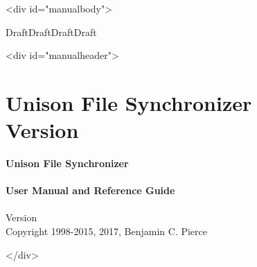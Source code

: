 \documentclass{article}
\begin{document}
\ifhevea\begin{rawhtml}<div id="manualbody">\end{rawhtml}\fi

\ifhevea\else\bigskip\fi%
\ifdraft%
\begin{center}%
{\Huge \ifhevea\red\fi DraftDraftDraftDraft}%
\end{center}%
\ifhevea\else \bigskip \fi
\fi

\ifhevea\begin{rawhtml}<div id="manualheader">\end{rawhtml}%
\else \thispagestyle{empty}
\fi%
%
\iftextversion
  \section*{Unison File Synchronizer
  \\
  Version
  \unisonversion
  }
\else%
  \ifhevea\else \vspace*{2in} \fi%
  \begin{center}%
  \Huge{\ifhevea\black\else\bf \fi Unison File  Synchronizer}%
  \ifhevea \\ \else \\[2ex] \fi%
  \huge {\ifhevea\black\else\bf \fi User Manual and Reference Guide}%
  \ifhevea \\ \else \\[6ex] \fi%
  \LARGE%
  Version \unisonversion \\[4ex] %
  \large Copyright 1998-2015, 2017, Benjamin C. Pierce
  \end{center}%
\fi%
%
%
\ifhevea\begin{rawhtml}</div>\end{rawhtml}\fi

\ifhevea\else\newpage\fi
\TABLEOFCONTENTS
\ifhevea\else\newpage\fi




\ifhevea\else\bigskip\fi

\end{document}
